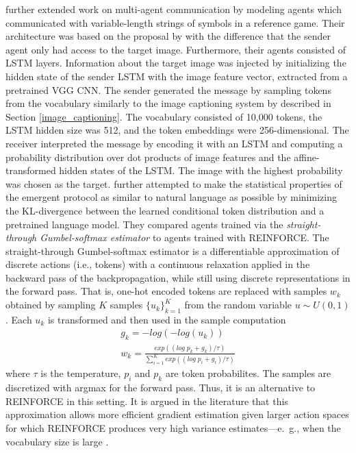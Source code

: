 \cite{havrylov2017emergence} further extended work on multi-agent communication by modeling agents which communicated with variable-length strings of symbols in a reference game. 
Their architecture was based on the proposal by \cite{lazaridou2016multi} with the difference that the sender agent only had access to the target image. Furthermore, their agents consisted of LSTM layers. Information about the target image was injected by initializing the hidden state of the sender LSTM with the image feature vector, extracted from a pretrained VGG CNN. The sender generated the message by sampling tokens from the vocabulary similarly to the image captioning system by \cite{vinyals2015show} described in Section \ref{image_captioning}. The vocabulary consisted of 10,000 tokens, the LSTM hidden size was 512, and the token embeddings were 256-dimensional. 
The receiver interpreted the message by encoding it with an LSTM and computing a probability distribution over dot products of image features and the affine-transformed hidden states of the LSTM. The image with the highest probability was chosen as the target. \cite{havrylov2017emergence} further attempted to make the statistical properties of the emergent protocol as similar to natural language as possible by minimizing the KL-divergence between the learned conditional token distribution and a pretrained language model.
They compared agents trained via the \textit{straight-through Gumbel-softmax estimator} to agents trained with REINFORCE. The straight-through Gumbel-softmax estimator is a differentiable approximation of discrete actions (i.e., tokens) with a continuous relaxation applied in the backward pass of the backpropagation, while still using discrete representations in the forward pass. 
That is, one-hot encoded tokens are replaced with samples $w_k$ obtained by sampling $K$ samples  $\{u_k\}_{k=1}^K$ from the random variable $u \sim U(0,1)$. Each $u_k$ is transformed and then used in the sample computation
\begin{equation}
\begin{aligned}
g_k = -log(-log(u_k)) \\
w_k = \frac{exp((log \; p_k + g_k) / \tau)}{\sum_{i=1}^{K} exp((log \; p_i + g_i) / \tau)}
\end{aligned}
\end{equation}
where $\tau$ is the temperature, $p_i$ and $p_k$ are token probabilites. The samples are discretized with argmax for the forward pass. Thus, it is an alternative to REINFORCE in this setting.
It is argued in the literature that this approximation allows more efficient gradient estimation given larger action spaces for which REINFORCE produces very high variance estimates---e.~g., when the vocabulary size is large \parencite{havrylov2017emergence}.

